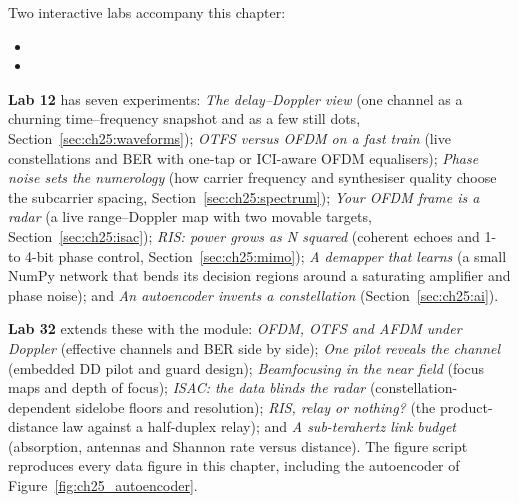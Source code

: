 \begin{labbox}
Two interactive labs accompany this chapter:
\begin{itemize}
\item {}
\item {}
\end{itemize}
\textbf{Lab 12} has seven experiments: \emph{The delay--Doppler view} (one channel as a churning
time--frequency snapshot and as a few still dots, Section~\ref{sec:ch25:waveforms}); \emph{OTFS versus
OFDM on a fast train} (live constellations and BER with one-tap or ICI-aware OFDM equalisers);
\emph{Phase noise sets the numerology} (how carrier frequency and synthesiser quality choose the
subcarrier spacing, Section~\ref{sec:ch25:spectrum}); \emph{Your OFDM frame is a radar} (a live
range--Doppler map with two movable targets, Section~\ref{sec:ch25:isac}); \emph{RIS: power grows as N
squared} (coherent echoes and 1- to 4-bit phase control, Section~\ref{sec:ch25:mimo}); \emph{A demapper
that learns} (a small NumPy network that bends its decision regions around a saturating amplifier and
phase noise); and \emph{An autoencoder invents a constellation} (Section~\ref{sec:ch25:ai}).

\textbf{Lab 32} extends these with the  module: \emph{OFDM, OTFS and AFDM under
Doppler} (effective channels and BER side by side); \emph{One pilot reveals the channel} (embedded
DD pilot and guard design); \emph{Beamfocusing in the near field} (focus maps and depth of focus);
\emph{ISAC: the data blinds the radar} (constellation-dependent sidelobe floors and resolution);
\emph{RIS, relay or nothing?} (the product-distance law against a half-duplex relay); and \emph{A
sub-terahertz link budget} (absorption, antennas and Shannon rate versus distance). The figure script
 reproduces every data figure in this chapter, including the
autoencoder of Figure~\ref{fig:ch25_autoencoder}.
\end{labbox}

